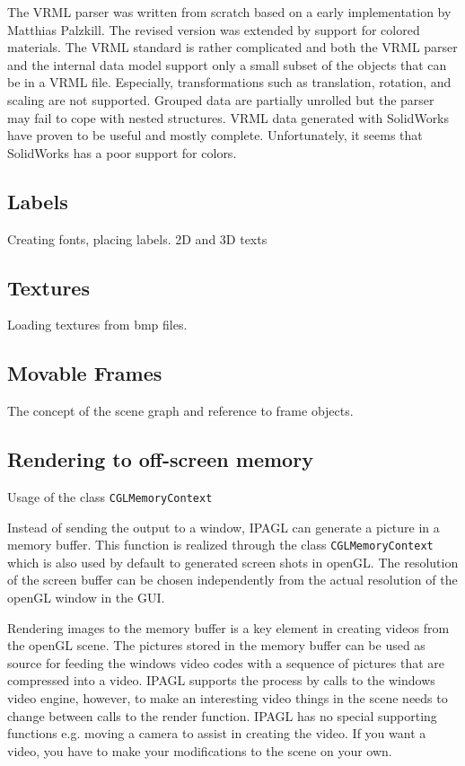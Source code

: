 \documentclass[11pt,a4paper,onepage,openany]{book}
\begin{document}
The VRML parser was written from scratch based on a early implementation by
Matthias Palzkill. The revised version was extended by support for colored
materials. The VRML standard is rather complicated and both the VRML parser and
the internal data model support only a small subset of the objects that can be
in a VRML file. Especially, transformations such as translation, rotation, and
scaling are not supported. Grouped data are partially unrolled but the parser
may fail to cope with nested structures. VRML data generated with SolidWorks
have proven to be useful and mostly complete. Unfortunately, it seems that
SolidWorks has a poor support for colors.

\subsection{Labels}
Creating fonts, placing labels. 2D and 3D texts

\subsection{Textures}
Loading textures from bmp files.

\subsection{Movable Frames}
The concept of the scene graph and reference to frame objects.

\subsection{Rendering to off-screen memory}
Usage of the class \texttt{CGLMemoryContext}

Instead of sending the output to a window, IPAGL can generate a picture in a
memory buffer. This function is realized through the class
\texttt{CGLMemoryContext} which is also used by default to generated screen
shots in openGL. The resolution of the screen buffer can be chosen
independently from the actual resolution of the openGL window in the GUI.

Rendering images to the memory buffer is a key element in creating videos from
the openGL scene. The pictures stored in the memory buffer can be used as
source for feeding the windows video codes with a sequence of pictures that are
compressed into a video. IPAGL supports the process by calls to the windows
video engine, however, to make an interesting video things in the scene needs
to change between calls to the render function. IPAGL has no special supporting
functions e.g. moving a camera to assist in creating the video. If you want a
video, you have to make your modifications to the scene on your own.
\end{document}
